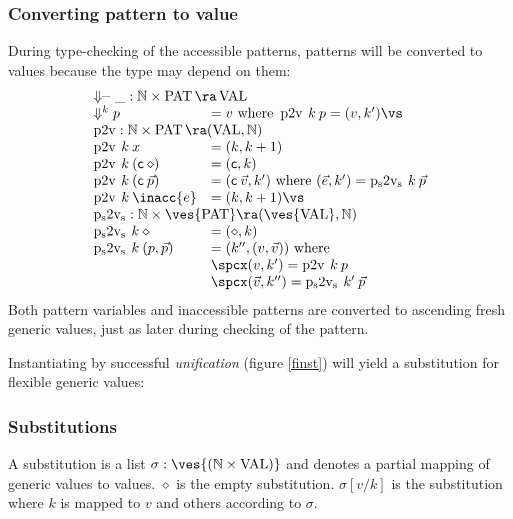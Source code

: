 \subsubsection{Converting pattern to value}
During type-checking of the accessible patterns, patterns will be converted to values because the type may depend on them:
\[
\begin{array}{ll}
\multicolumn{2}{l}{\ptv{\_}{\_}: \cN \times \Pat \ra \Val}\\
\ptv{k}{p} & = v \mbox{ where } \ptvx \: k \: p = (v,k')
\vs\\ 
\multicolumn{2}{l}{\ptvx : \cN \times \Pat \ra (\Val,\cN)}\\
\ptvx \: k \:x & = (k,k+1) \\
\ptvx \: k \: (\cc \: \diamond) & = (\cc,k) \\
\ptvx \: k \: (\cc \: \vec{p}) & = (\cc \: \vec{v},k') \mbox{ where } (\vec{e},k') = \pstvs \: k \: \vec{p}\\
\ptvx \: k \: \inacc{e} & = (k,k+1) 
\vs\\
\multicolumn{2}{l}{\pstvs : \cN \times \ves{\Pat} \ra (\ves{\Val},\cN)}\\
\pstvs \: k \: \diamond & = (\diamond,k) \\
\pstvs \: k \: (p,\vec{p}) & = (k'', (v,\vec{v})) \mbox{ where } \\
& \spcx (v,k') = \ptvx \: k \: p \\
& \spcx (\vec{v},k'') = \pstvs \: k' \: \vec{p}  
\end{array}
\]
Both pattern variables and inaccessible patterns are converted to ascending fresh generic values, just as later during checking of the pattern.

Instantiating by successful \emph{unification} (figure \ref{finst}) will yield a substitution for flexible generic values:
\subsubsection{Substitutions}
A substitution is a list $\sigma : \ves{(\cN \times \Val)} $ and denotes a partial mapping of generic values to values.
$\diamond$ is the empty substitution.
$\sigma[v/k] $ is the substitution where $k$ is mapped to $v$ and others according to $\sigma$.

